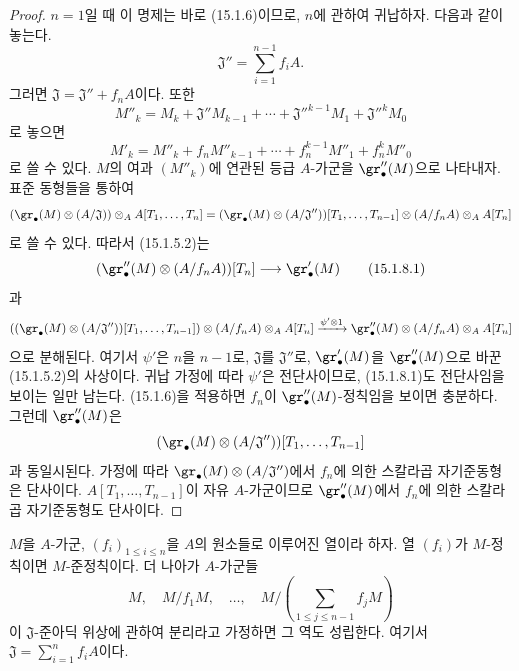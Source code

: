 \begin{proof}
$n=1$일 때 이 명제는 바로 (15.1.6)이므로, $n$에 관하여 귀납하자.
다음과 같이 놓는다.
\[
  \mathfrak{J}''=\sum_{i=1}^{n-1}f_iA.
\]
그러면 $\mathfrak{J}=\mathfrak{J}''+f_nA$이다. 또한
\[
  M''_k=M_k+\mathfrak{J}''M_{k-1}+\cdots+
  \mathfrak{J}''^{k-1}M_1+\mathfrak{J}''^kM_0
\]
로 놓으면
\[
  M'_k=M''_k+f_nM''_{k-1}+\cdots+f_n^{k-1}M''_1+f_n^kM''_0
\]
로 쓸 수 있다. $M$의 여과 $(M''_k)$에 연관된 등급 $A$-가군을
$\gr''_\bullet(M)$으로 나타내자. 표준 동형들을 통하여
\[
  (\gr_\bullet(M)\otimes(A/\mathfrak{J}))\otimes_A A[T_1,\ldots,T_n]
  =
  (\gr_\bullet(M)\otimes(A/\mathfrak{J}''))[T_1,\ldots,T_{n-1}]
  \otimes(A/f_nA)\otimes_A A[T_n]
\]
로 쓸 수 있다. 따라서 (15.1.5.2)는
\[
  (\gr''_\bullet(M)\otimes(A/f_nA))[T_n]\longrightarrow\gr'_\bullet(M)
  \tag{15.1.8.1}\label{0.15.1.8.1-fr}
\]
과
\[
  ((\gr_\bullet(M)\otimes(A/\mathfrak{J}''))[T_1,\ldots,T_{n-1}])
  \otimes(A/f_nA)\otimes_A A[T_n]
  \xrightarrow{\psi'\otimes1}
  \gr''_\bullet(M)\otimes(A/f_nA)\otimes_A A[T_n]
\]
으로 분해된다. 여기서 $\psi'$은 $n$을 $n-1$로, $\mathfrak{J}$를
$\mathfrak{J}''$로, $\gr'_\bullet(M)$을 $\gr''_\bullet(M)$으로 바꾼
(15.1.5.2)의 사상이다. 귀납 가정에 따라 $\psi'$은 전단사이므로,
(15.1.8.1)도 전단사임을 보이는 일만 남는다. (15.1.6)을 적용하면
$f_n$이 $\gr''_\bullet(M)$-정칙임을 보이면 충분하다. 그런데
$\gr''_\bullet(M)$은
\[
  (\gr_\bullet(M)\otimes(A/\mathfrak{J}''))
  [T_1,\ldots,T_{n-1}]
\]
과 동일시된다. 가정에 따라
$\gr_\bullet(M)\otimes(A/\mathfrak{J}'')$에서 $f_n$에 의한
스칼라곱 자기준동형은 단사이다. $A[T_1,\ldots,T_{n-1}]$이 자유
$A$-가군이므로 $\gr''_\bullet(M)$에서 $f_n$에 의한 스칼라곱
자기준동형도 단사이다.
\end{proof}

\begin{proposition}[15.1.9]
\label{0.15.1.9-fr}
$M$을 $A$-가군, $(f_i)_{1\leq i\leq n}$을 $A$의 원소들로 이루어진
열이라 하자. 열 $(f_i)$가 $M$-정칙이면 $M$-준정칙이다. 더 나아가
$A$-가군들
\[
  M,\quad M/f_1M,\quad\ldots,\quad
  M/\left(\sum_{1\leq j\leq n-1}f_jM\right)
\]
이 $\mathfrak{J}$-준아딕 위상에 관하여 분리라고 가정하면 그 역도
성립한다. 여기서 $\mathfrak{J}=\sum_{i=1}^n f_iA$이다.
\end{proposition}

